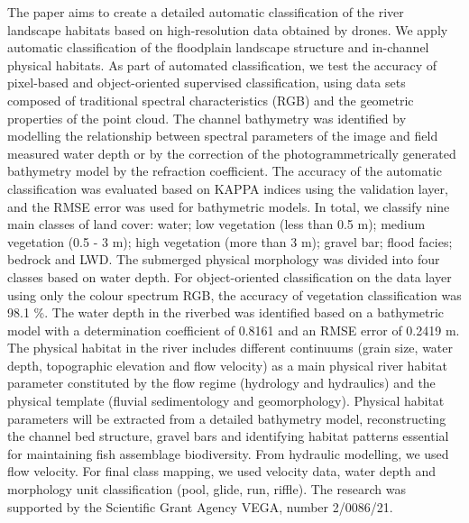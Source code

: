 {The paper aims to create a detailed automatic classification of the river landscape habitats based on high-resolution data obtained by drones. We apply automatic classification of the floodplain landscape structure and in-channel physical habitats. As part of automated classification, we test the accuracy of pixel-based and object-oriented supervised classification, using data sets composed of traditional spectral characteristics (RGB) and the geometric properties of the point cloud. The channel bathymetry was identified by modelling the relationship between spectral parameters of the image and field measured water depth or by the correction of the photogrammetrically generated bathymetry model by the refraction coefficient. The accuracy of the automatic classification was evaluated based on KAPPA indices using the validation layer, and the RMSE error was used for bathymetric models. In total, we classify nine main classes of land cover: water; low vegetation (less than 0.5 m); medium vegetation (0.5 - 3 m); high vegetation (more than 3 m); gravel bar; flood facies; bedrock and LWD. The submerged physical morphology was divided into four classes based on water depth. For object-oriented classification on the data layer using only the colour spectrum RGB, the accuracy of vegetation classification was 98.1 \%. The water depth in the riverbed was identified based on a bathymetric model with a determination coefficient of 0.8161 and an RMSE error of 0.2419 m. The physical habitat in the river includes different continuums (grain size, water depth, topographic elevation and flow velocity) as a main physical river habitat parameter constituted by the flow regime (hydrology and hydraulics) and the physical template (fluvial sedimentology and geomorphology). Physical habitat parameters will be extracted from a detailed bathymetry model, reconstructing the channel bed structure, gravel bars and identifying habitat patterns essential for maintaining fish assemblage biodiversity. From hydraulic modelling, we used flow velocity. For final class mapping, we used velocity data, water depth and morphology unit classification (pool, glide, run, riffle). The research was supported by the Scientific Grant Agency VEGA, number 2/0086/21.
}%
{}%

